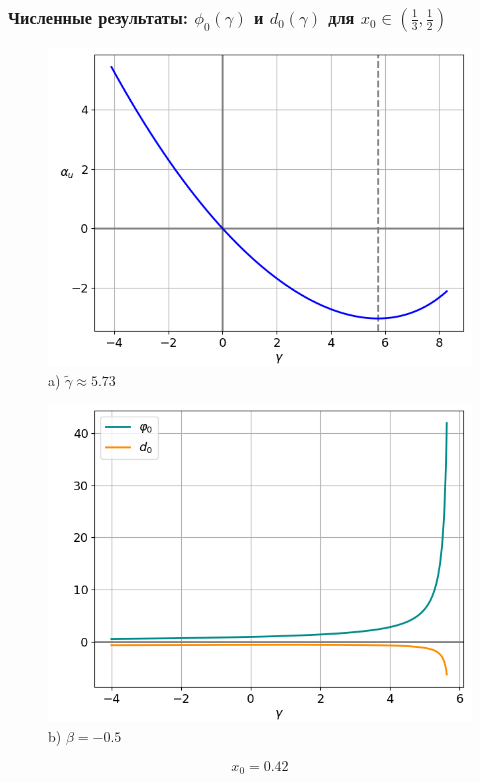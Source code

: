 \documentclass[fullscreen=true, unicode, bookmarks=false]{beamer}
\begin{document}
\begin{frame}
\frametitle{ Численные результаты: $ \phi_0(\gamma) $ и $ d_0(\gamma) $ для $ x_0 \in \left( \frac{1}{3}, \frac{1}{2} \right) $ }

\begin{figure} 
\begin{minipage}[h]{0.49\linewidth}
\begin{center}
\includegraphics[scale=0.38]{x0=0,42.png} \\ {\scriptsize a) $ \widetilde{\gamma} \approx 5.73 $}
\end{center}
\end{minipage} 
\hfill
\begin{minipage}[h]{0.49\linewidth}
\begin{center}
\includegraphics[scale=0.38]{divergent_phi0d0_x0=0,42,beta=-0,5_before.png}  \\ {\scriptsize b) $ \beta = -0.5 $}
\end{center}
\end{minipage} 
\end{figure}

$$ x_0 = 0.42 $$

\end{frame}
\end{document}
